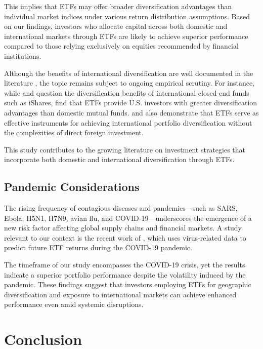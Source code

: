 \documentclass{article}
\begin{document}
This implies that ETFs may offer broader diversification advantages than individual market indices under various return distribution assumptions. Based on our findings, investors who allocate capital across both domestic and international markets through ETFs are likely to achieve superior performance compared to those relying exclusively on equities recommended by financial institutions.

Although the benefits of international diversification are well documented in the literature \citep{Grubel_1968, Lessard_1973, Hodrick_Zhang_2014}, the topic remains subject to ongoing empirical scrutiny. For instance, while \citet{Pennathur_Delcoure_Anderson_2002} and \citet{Zhong_Yang_2005} question the diversification benefits of international closed-end funds such as iShares, \citet{Tsai_Swanson_2009} find that ETFs provide U.S. investors with greater diversification advantages than domestic mutual funds. \citet{Huang_Lin_2011} and \citet{OHaganLuff_Berrill_2015} also demonstrate that ETFs serve as effective instruments for achieving international portfolio diversification without the complexities of direct foreign investment.

This study contributes to the growing literature on investment strategies that incorporate both domestic and international diversification through ETFs.

\subsection{Pandemic Considerations}

The rising frequency of contagious diseases and pandemics—such as SARS, Ebola, H5N1, H7N9, avian flu, and COVID-19—underscores the emergence of a new risk factor affecting global supply chains and financial markets. A study relevant to our context is the recent work of \citet{Navratil_Taylor_Vecer_2021}, which uses virus-related data to predict future ETF returns during the COVID-19 pandemic.

The timeframe of our study encompasses the COVID-19 crisis, yet the results indicate a superior portfolio performance despite the volatility induced by the pandemic. These findings suggest that investors employing ETFs for geographic diversification and exposure to international markets can achieve enhanced performance even amid systemic disruptions.

\section{Conclusion}
\end{document}
